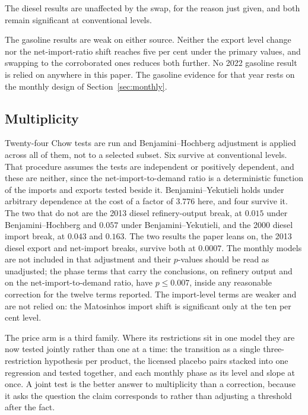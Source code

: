 \documentclass[11pt,a4paper]{article}
\begin{document}
The diesel results are unaffected by the swap, for the reason just given, and both remain
significant at conventional levels.

The gasoline results are weak on either source. Neither the export level change nor the net-import-ratio
shift reaches five per cent under the primary values, and swapping to the
corroborated ones reduces both further. No 2022 gasoline result is relied on anywhere in this
paper. The gasoline evidence for that year rests on the monthly design of
Section~\ref{sec:monthly}.

\subsection{Multiplicity}

Twenty-four Chow tests are run and Benjamini--Hochberg adjustment is applied across all of
them, not to a selected subset. Six survive at conventional levels. That procedure assumes the
tests are independent or positively dependent, and these are neither, since the
net-import-to-demand ratio is a deterministic function of the imports and exports tested
beside it. Benjamini--Yekutieli \citep{benjamini2001control} holds under arbitrary dependence at the cost
of a factor of
$3.776$ here, and four survive it. The two that do not are the 2013 diesel refinery-output
break, at $0.015$ under Benjamini--Hochberg and $0.057$ under Benjamini--Yekutieli, and the
2000 diesel import break, at $0.043$ and $0.163$. The two results the paper leans on, the 2013
diesel export and net-import breaks, survive both at $0.0007$. The monthly models are not
included in that adjustment and their $p$-values should be read as unadjusted; the phase terms
that carry the conclusions, on refinery output and on the net-import-to-demand ratio, have $p\le 0.007$,
inside any reasonable correction for the twelve terms reported. The import-level terms are
weaker and are not relied on: the Matosinhos import shift is significant only at the ten per
cent level.

The price arm is a third family. Where its restrictions sit in one model they are now tested
jointly rather than one at a time: the transition as a single three-restriction hypothesis per
product, the licensed placebo pairs stacked into one regression and tested together, and each
monthly phase as its level and slope at once. A joint test is the better answer to multiplicity
than a correction, because it asks the question the claim corresponds to rather than adjusting a
threshold after the fact.
\end{document}
